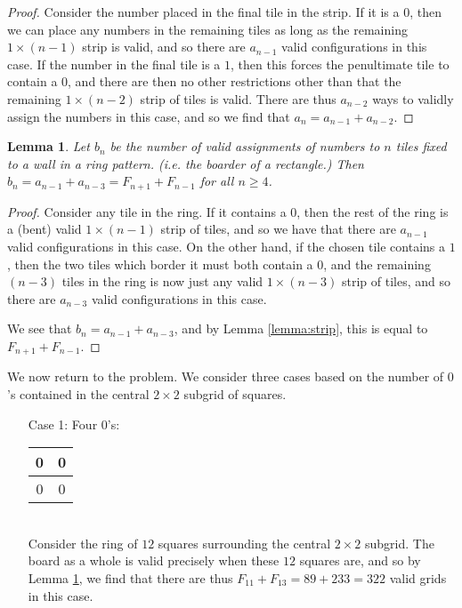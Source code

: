 \documentclass[a4paper,12pt]{article}
\newtheorem{lemma}{Lemma}
\newcommand{\grid}[4]{ %
    \begin{tabular}{|c|c|} %
        \hline %
        #1 & #2 \\
        \hline %
        #3 & #4 \\
        \hline %
    \end{tabular} %
}
\begin{document}
\begin{enumerate}
\begin{proof}
        Consider the number placed in the final tile in the strip. If it is a
        $0$, then we can place any numbers in the remaining tiles as long as
        the remaining $1 \times (n-1)$ strip is valid, and so there are
        $a_{n-1}$ valid configurations in this case. If the number in the final
        tile is a $1$,
        then this forces the penultimate tile to contain a $0$, and there
        are then no other restrictions other than that the remaining $1 \times
        (n-2)$ strip of tiles is valid. There are thus $a_{n-2}$ ways to validly
        assign the numbers in this case, and so we find that $a_n = a_{n-1} +
        a_{n-2}$.
    \end{proof}

    \begin{lemma} \label{lemma:ring}
        Let $b_n$ be the number of valid assignments of numbers to $n$ tiles
        fixed to a wall in a ring pattern. (i.e. the boarder of a
        rectangle.) Then
        $b_n = a_{n-1} + a_{n-3} = F_{n+1} + F_{n-1}$ for all $n \geq 4$.
    \end{lemma}
    \begin{proof}
        Consider any tile in the ring. If it contains a $0$, then the rest of
        the ring is a (bent) valid $1 \times (n-1)$ strip of tiles, and so we
        have that there are $a_{n-1}$ valid configurations in this case. On the
        other hand, if the chosen tile contains a $1$, then the two tiles
        which border it must both contain a $0$, and the remaining $(n-3)$
        tiles in the ring is now just any valid $1 \times (n-3)$ strip of
        tiles, and so there are $a_{n-3}$ valid configurations in this case.
     
        We see that $b_n = a_{n-1} + a_{n-3}$, and by Lemma \ref{lemma:strip},
        this is equal to $F_{n+1} + F_{n-1}$.
    \end{proof}

We now return to the problem. We consider three cases based on the number
of $0$'s contained in the central $2 \times 2$ subgrid of squares.

\begin{enumerate}

    \item[Case 1:] Four $0$'s: \grid{0}{0}{0}{0} \\
        
        Consider the ring of $12$ squares surrounding the central $2 \times
        2$ subgrid. The board as a whole is valid precisely when these $12$
        squares are, and so by Lemma \ref{lemma:ring}, we find that there
        are thus $F_{11} + F_{13} = 89 + 233 = 322$ valid grids in this case.


\end{enumerate}
\end{enumerate}
\end{document}
